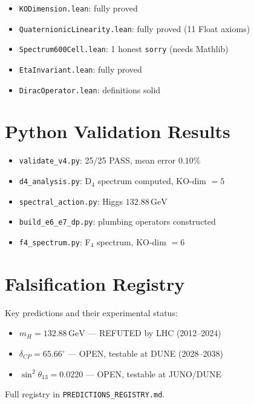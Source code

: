 \documentclass[11pt,a4paper]{article}
\theoremstyle{definition}
\begin{document}
\begin{itemize}
  \item \texttt{KODimension.lean}: fully proved
  \item \texttt{QuaternionicLinearity.lean}: fully proved (11 Float axioms)
  \item \texttt{Spectrum600Cell.lean}: 1 honest \texttt{sorry} (needs Mathlib)
  \item \texttt{EtaInvariant.lean}: fully proved
  \item \texttt{DiracOperator.lean}: definitions solid
\end{itemize}

\section{Python Validation Results}\label{app:python}

\begin{itemize}
  \item \texttt{validate\_v4.py}: 25/25 PASS, mean error $0.10\%$
  \item \texttt{d4\_analysis.py}: D$_4$ spectrum computed, KO-dim $= 5$
  \item \texttt{spectral\_action.py}: Higgs $132.88\,\text{GeV}$
  \item \texttt{build\_e6\_e7\_dp.py}: plumbing operators constructed
  \item \texttt{f4\_spectrum.py}: F$_4$ spectrum, KO-dim $= 6$
\end{itemize}

\section{Falsification Registry}\label{app:falsify}

Key predictions and their experimental status:
\begin{itemize}
  \item $m_H = 132.88\,\text{GeV}$ — REFUTED by LHC (2012--2024)
  \item $\delta_{CP} = 65.66^\circ$ — OPEN, testable at DUNE (2028--2038)
  \item $\sin^2\theta_{13} = 0.0220$ — OPEN, testable at JUNO/DUNE
\end{itemize}
Full registry in \texttt{PREDICTIONS\_REGISTRY.md}.
\end{document}
